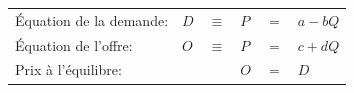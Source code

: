 \begin{tabular}{llllll}
    Équation de la demande:    & $D$ & $\equiv$ & $P$ & $=$ & $a - bQ$\\
    Équation de l’offre:       & $O$ & $\equiv$ & $P$ & $=$ & $c + dQ$\\
    Prix à l’équilibre:        &     &          & $O$ & $=$ & $D$
\end{tabular}